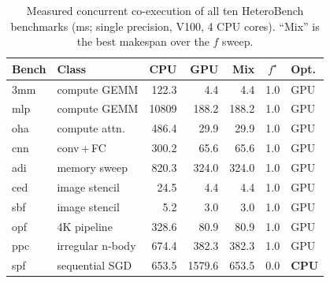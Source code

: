 \documentclass[conference]{IEEEtran}
\begin{document}
\begin{table}[t]
\centering\footnotesize
\caption{Measured concurrent co-execution of all ten HeteroBench benchmarks (ms; single
precision, V100, 4 CPU cores). ``Mix'' is the best makespan over the $f$ sweep.}
\label{tab:suite}
\begin{tabular}{@{}llrrrcl@{}}
\toprule
\textbf{Bench} & \textbf{Class} & \textbf{CPU} & \textbf{GPU} & \textbf{Mix} & \textbf{$f^\star$} & \textbf{Opt.} \\
\midrule
3mm & compute GEMM   & 122.3   & 4.4   & 4.4   & 1.0 & GPU \\
mlp & compute GEMM   & 10809   & 188.2 & 188.2 & 1.0 & GPU \\
oha & compute attn.  & 486.4   & 29.9  & 29.9  & 1.0 & GPU \\
cnn & conv\,+\,FC    & 300.2   & 65.6  & 65.6  & 1.0 & GPU \\
adi & memory sweep   & 820.3   & 324.0 & 324.0 & 1.0 & GPU \\
ced & image stencil  & 24.5    & 4.4   & 4.4   & 1.0 & GPU \\
sbf & image stencil  & 5.2     & 3.0   & 3.0   & 1.0 & GPU \\
opf & 4K pipeline    & 328.6   & 80.9  & 80.9  & 1.0 & GPU \\
ppc & irregular n-body & 674.4 & 382.3 & 382.3 & 1.0 & GPU \\
spf & sequential SGD & 653.5   & 1579.6& 653.5 & 0.0 & \textbf{CPU} \\
\bottomrule
\end{tabular}
\end{table}
\end{document}
